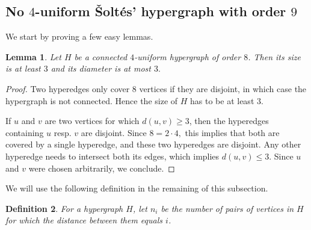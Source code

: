 \documentclass[a4paper,11pt]{article}
\newtheorem{defi}{Definition}
\newtheorem{lem}[defi]{Lemma}
\begin{document}
\subsection{No $4$-uniform \v Solt\'es' hypergraph with order $9$}

We start by proving a few easy lemmas.

\begin{lem}\label{lem:sizediam3}
    Let $H$ be a connected $4$-uniform hypergraph of order $8$.
    Then its size is at least $3$ and its diameter is at most $3.$
\end{lem}

\begin{proof}
 Two hyperedges only cover $8$ vertices if they are disjoint, in which case the hypergraph is not connected. Hence the size of $H$ has to be at least $3.$

    If $u$ and $v$ are two vertices for which $d(u,v) \ge 3$, then the hyperedges containing $u$ resp. $v$ are disjoint. Since $8=2 \cdot 4,$ this implies that both are covered by a single hyperedge, and these two hyperedges are disjoint.
    Any other hyperedge needs to intersect both its edges, which implies $d(u,v) \le 3.$
    Since $u$ and $v$ were chosen arbitrarily, we conclude.
\end{proof}

We will use the following definition in the remaining of this subsection.

\begin{defi}
    For a hypergraph $H$, let $n_i$ be the number of pairs of vertices in $H$ for which the distance between them equals $i$.
\end{defi}
\end{document}
